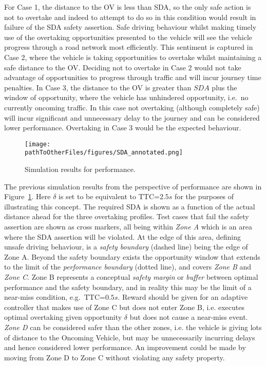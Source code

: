 For Case 1, the distance to the OV is less than SDA, so the only safe action is not to overtake and indeed to attempt to do so in this condition would result in failure of the SDA safety assertion. Safe driving behaviour whilst making timely use of the overtaking opportunities presented to the vehicle will see the vehicle progress through a road network most efficiently. This sentiment is captured in Case 2, where the vehicle is taking opportunities to overtake whilst maintaining a safe distance to the OV. Deciding not to overtake in Case 2 would not take advantage of opportunities to progress through traffic and will incur journey time penalties. In Case 3, the distance to the OV is greater than $SDA$ plus the window of opportunity, where the vehicle has unhindered opportunity, i.e.\ no currently oncoming traffic. In this case not overtaking (although completely safe) will incur significant and unnecessary delay to the journey and can be considered lower performance. Overtaking in Case 3 would be the expected behaviour.  

\begin{figure}[t]
    \centering
    \texttt{[image: \\pathToOtherFiles/figures/SDA\_annotated.png]}
    \caption{Simulation results for performance.}
    \label{fig:performance_results}
\end{figure}

The previous simulation results from the perspective of performance are shown in Figure~\ref{fig:performance_results}. Here $\delta$ is set to be equivalent to TTC=$2.5s$ \cite{Robbins2018,Chen2015,wang2019analysis} for the purposes of illustrating this concept. The required SDA is shown as a function of the actual distance ahead for the three overtaking profiles. Test cases that fail the safety assertion are shown as cross markers, all being within \emph{Zone A} which is an area where the SDA assertion will be violated. At the edge of this area, defining unsafe driving behaviour, is a \emph{safety boundary} (dashed line) being the edge of Zone A. Beyond the safety boundary exists the opportunity window that extends to the limit of the \emph{performance boundary} (dotted line), and covers \emph{Zone B} and \emph{Zone C}. Zone B represents a conceptual \emph{safety margin} or \emph{buffer} between optimal performance and the safety boundary, and in reality this may be the limit of a near-miss condition, e.g.\ TTC=$0.5s$. Reward should be given for an adaptive controller that makes use of Zone C but does not enter Zone B, i.e. executes optimal overtaking given opportunity $\delta$ but does not cause a near-miss event. \emph{Zone D} can be considered safer than the other zones, i.e. the vehicle is giving lots of distance to the Oncoming Vehicle, but may be unnecessarily incurring delays and hence considered lower performance. An improvement could be made by moving from Zone D to Zone C without violating any safety property. 



